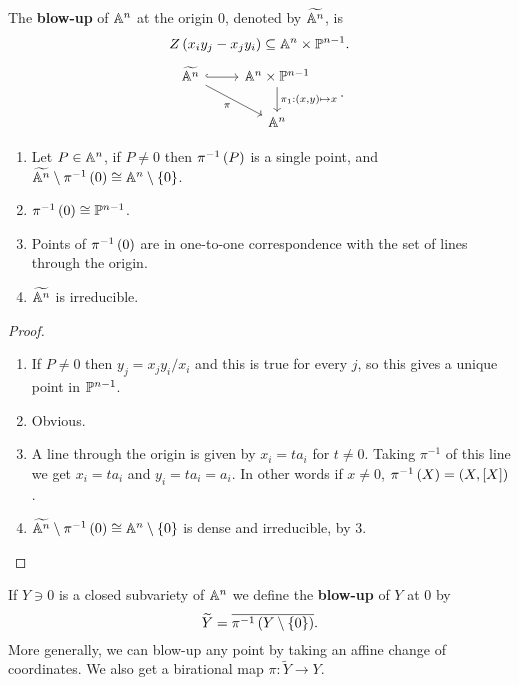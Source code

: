 \pagebreak

\begin{definition}
The \textbf{blow-up} of $ \A^n $ at the origin $ 0 $, denoted by $ \widetilde{\A^n} $, is
$$ Z\rb{x_iy_j - x_jy_i} \subseteq \A^n \times \P^{n - 1}. $$
$$
\begin{tikzcd}
\widetilde{\A^n} \arrow[hookrightarrow]{r} \arrow[swap]{dr}{\pi} & \A^n \times \P^{n - 1} \arrow{d}{\pi_1 : \rb{x, y} \mapsto x} \\
& \A^n
\end{tikzcd}.
$$
\end{definition}

\begin{proposition}
\hfill
\begin{enumerate}
\item Let $ P \in \A^n $, if $ P \ne 0 $ then $ \pi^{-1}\rb{P} $ is a single point, and $ \widetilde{\A^n} \setminus \pi^{-1}\rb{0} \cong \A^n \setminus \cb{0} $.
\item $ \pi^{-1}\rb{0} \cong \P^{n - 1} $.
\item Points of $ \pi^{-1}\rb{0} $ are in one-to-one correspondence with the set of lines through the origin.
\item $ \widetilde{\A^n} $ is irreducible.
\end{enumerate}
\end{proposition}

\begin{proof}
\hfill
\begin{enumerate}
\item If $ P \ne 0 $ then $ y_j = x_jy_i/x_i $ and this is true for every $ j $, so this gives a unique point in $ \P^{n - 1} $.
\item Obvious.
\item A line through the origin is given by $ x_i = ta_i $ for $ t \ne 0 $. Taking $ \pi^{-1} $ of this line we get $ x_i = ta_i $ and $ y_i = ta_i = a_i $. In other words if $ x \ne 0 $, $ \pi^{-1}\rb{X} = \rb{X, \sb{X}} $.
\item $ \widetilde{\A^n} \setminus \pi^{-1}\rb{0} \cong \A^n \setminus \cb{0} $ is dense and irreducible, by $ 3 $.
\end{enumerate}
\end{proof}

\begin{definition}
If $ Y \ni 0 $ is a closed subvariety of $ \A^n $ we define the \textbf{blow-up} of $ Y $ at $ 0 $ by
$$ \widetilde{Y} = \overline{\pi^{-1}\rb{Y \setminus \cb{0}}}. $$
More generally, we can blow-up any point by taking an affine change of coordinates. We also get a birational map $ \pi : \widetilde{Y} \to Y $.
\end{definition}

